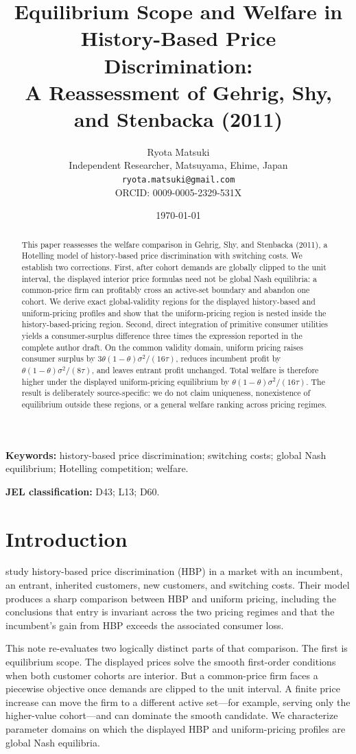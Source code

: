 \documentclass[11pt]{article}
\title{Equilibrium Scope and Welfare in History-Based Price Discrimination:\\
A Reassessment of Gehrig, Shy, and Stenbacka (2011)}
\author{Ryota Matsuki\\
Independent Researcher, Matsuyama, Ehime, Japan\\
\texttt{ryota.matsuki@gmail.com}\\
ORCID: 0009-0005-2329-531X}
\date{\today}
\begin{document}
\maketitle

\begin{abstract}
This paper reassesses the welfare comparison in Gehrig, Shy, and Stenbacka
(2011), a Hotelling model of history-based price discrimination with switching
costs. We establish two corrections. First, after cohort demands are globally
clipped to the unit interval, the displayed interior price formulas need not be
global Nash equilibria: a common-price firm can profitably cross an active-set
boundary and abandon one cohort. We derive exact global-validity regions for
the displayed history-based and uniform-pricing profiles and show that the
uniform-pricing region is nested inside the history-based-pricing region.
Second, direct integration of primitive consumer utilities yields a
consumer-surplus difference three times the expression reported in the complete
author draft. On the common validity domain, uniform pricing raises consumer
surplus by $3\theta(1-\theta)\sigma^2/(16\tau)$, reduces incumbent profit by
$\theta(1-\theta)\sigma^2/(8\tau)$, and leaves entrant profit unchanged.
Total welfare is therefore higher under the displayed uniform-pricing
equilibrium by $\theta(1-\theta)\sigma^2/(16\tau)$. The result is deliberately
source-specific: we do not claim uniqueness, nonexistence of equilibrium
outside these regions, or a general welfare ranking across pricing regimes.
\end{abstract}

\noindent\textbf{Keywords:} history-based price discrimination; switching costs;
global Nash equilibrium; Hotelling competition; welfare.

\noindent\textbf{JEL classification:} D43; L13; D60.

\section{Introduction}

\citet{gehrig2011} study history-based price discrimination (HBP) in a market
with an incumbent, an entrant, inherited customers, new customers, and
switching costs. Their model produces a sharp comparison between HBP and
uniform pricing, including the conclusions that entry is invariant across the
two pricing regimes and that the incumbent's gain from HBP exceeds the
associated consumer loss.

This note re-evaluates two logically distinct parts of that comparison. The
first is equilibrium scope. The displayed prices solve the smooth first-order
conditions when both customer cohorts are interior. But a common-price firm
faces a piecewise objective once demands are clipped to the unit interval. A
finite price increase can move the firm to a different active set---for
example, serving only the higher-value cohort---and can dominate the smooth
candidate. We characterize parameter domains on which the displayed HBP and
uniform-pricing profiles are global Nash equilibria.
\end{document}
